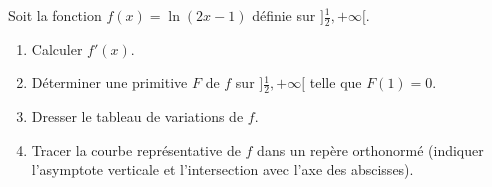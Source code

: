 \documentclass[11pt]{article}
\begin{document}
\begin{exercice}
Soit la fonction $f(x) = \ln(2x-1)$ définie sur $]\frac{1}{2}, +\infty[$.
\begin{enumerate}
    \item Calculer $f'(x)$.
    \item Déterminer une primitive $F$ de $f$ sur $]\frac{1}{2}, +\infty[$ telle que $F(1)=0$.
    \item Dresser le tableau de variations de $f$.
    \item Tracer la courbe représentative de $f$ dans un repère orthonormé (indiquer l'asymptote verticale et l'intersection avec l'axe des abscisses).
\end{enumerate}
\end{exercice}
\end{document}
